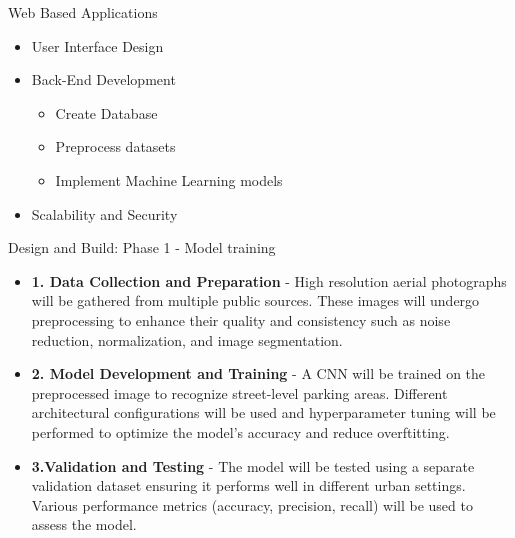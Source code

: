 \documentclass{beamer}
\begin{document}
\begin{frame}{Web Based Applications}
    \begin{itemize}
        \item{User Interface Design}
        \item{Back-End Development}
        \begin{itemize}
        \item{Create Database}
        \item{Preprocess datasets}
        \item{Implement Machine Learning models}
        \end{itemize}
        \item{Scalability and Security}
    \end{itemize}
\end{frame}


\begin{frame}{Design and Build: Phase 1 - Model training}
    \begin{itemize}
        \item{\textbf{1. Data Collection and Preparation} - } High resolution aerial photographs will be gathered from multiple public sources. These images will undergo preprocessing to enhance their quality and consistency such as noise reduction, normalization, and image segmentation.
        \item{\textbf{2. Model Development and Training} - } A CNN will be trained on the preprocessed image to recognize street-level parking areas. Different architectural configurations will be used and hyperparameter tuning will be performed to optimize the model's accuracy and reduce overftitting.
        \item{\textbf{3.Validation and Testing} - } The model will be tested using a separate validation dataset ensuring it performs well in different urban settings. Various performance metrics (accuracy, precision, recall) will be used to assess the model.
    \end{itemize}
\end{frame}
\end{document}
